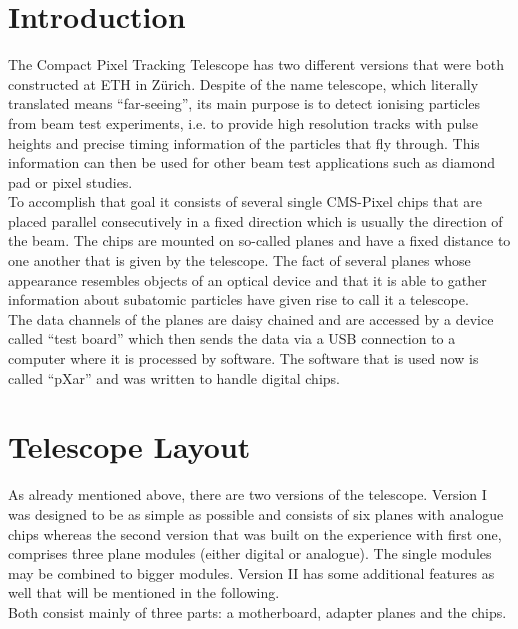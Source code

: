 \documentclass[british,11pt,a4paper]{memoir}
\begin{document}
\section{Introduction}\label{s20}
The Compact Pixel Tracking Telescope has two different versions that were both constructed at \ac{ETH} in Zürich. Despite of the name telescope, which literally translated means ``far-seeing'', its main purpose is to detect ionising particles from beam test experiments, i.e. to provide high resolution tracks with pulse heights and precise timing information of the particles that fly through. This information can then be used for other beam test applications such as diamond pad or pixel studies.\\ 
To accomplish that goal it consists of several single \ac{CMS}-Pixel chips that are placed parallel consecutively in a fixed direction which is usually the direction of the beam. The chips are mounted on so-called planes and have a fixed distance to one another that is given by the telescope. The fact of several planes whose appearance resembles objects of an optical device and that it is able to gather information about subatomic particles have given rise to call it a telescope.\\
The data channels of the planes are daisy chained and are accessed by a device called ``test board'' which then sends the data via a USB connection to a computer where it is processed by software. The software that is used now is called ``pXar'' and was written to handle digital chips.
\section{Telescope Layout}\label{s21}
As already mentioned above, there are two versions of the telescope. Version I was designed to be as simple as possible and consists of six planes with analogue chips whereas the second version that was built on the experience with first one, comprises three plane modules (either digital or analogue). The single modules may be combined to bigger modules. Version II has some additional features as well that will be mentioned in the following.\\
Both consist mainly of three parts: a motherboard, adapter planes and the chips.
\end{document}

